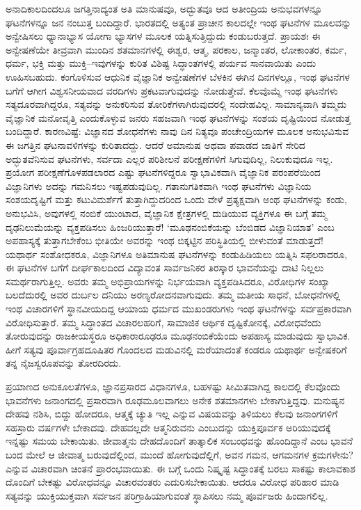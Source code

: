 ಅನಾದಿಕಾಲದಿಂದಲೂ ಜಗತ್ತಿನಾದ್ಯಂತ ಅತಿ ಮಾನುಷವೂ, ಅದ್ಭುತವೂ ಆದ ಅತೀಂದ್ರಿಯ ಅನುಭವಗಳನ್ನೂ ಘಟನೆಗಳನ್ನೂ ಜನ ನಂಬುತ್ತ ಬಂದಿದ್ದಾರೆ. ಭಾರತದಲ್ಲಿ ಅತ್ಯಂತ ಪ್ರಾಚೀನ ಕಾಲದಲ್ಲೇ ಇಂಥ ಘಟನೆಗಳ ಮೂಲವನ್ನು ಅನ್ವೇಷಿಸಲು ಧ್ಯಾನಾಭ್ಯಾಸ ಯೋಗಾ ಭ್ಯಾಸಗಳ ಮೂಲಕ ಯತ್ನಿಸುತ್ತಿದ್ದುದು ಕಂಡುಬರುತ್ತದೆ. ಪ್ರಾಯಶಃ ಈ ಅನ್ವೇಷಣೆಯೇ ತೀವ್ರವಾಗಿ ಮುಂದಿನ ಶತಮಾನಗಳಲ್ಲಿ ಈಶ್ವರ, ಆತ್ಮ, ಪರಕಾಲ, ಜನ್ಮಾಂತರ, ಲೋಕಾಂತರ, ಕರ್ಮ, ಧರ್ಮ, ಭಕ್ತಿ ಮತ್ತು ಮುಕ್ತಿ–ಇವುಗಳನ್ನು ಕುರಿತ ವಿಶಿಷ್ಟ ಸಿದ್ಧಾಂತಗಳಲ್ಲಿ ಪರ್ಯವ ಸಾನವಾಯಿತು ಎಂದು ಊಹಿಸಬಹುದು. ಕಂಗೊಳಿಸುವ ಆಧುನಿಕ ವೈಜ್ಞಾನಿಕ ಅನ್ವೇಷಣೆಗಳ ಬೆಳಕಿನ ಈಗಿನ ದಿನಗಳಲ್ಲೂ, ಇಂಥ ಘಟನೆಗಳ ಬಗೆಗೆ ಆಗೀಗ ವಿಶ್ವಸನೀಯವಾದ ವರದಿಗಳು ಪ್ರಕಟವಾಗುವುದನ್ನು ನೋಡುತ್ತೇವೆ. ಕೆಲವೊಮ್ಮೆ ಇಂಥ ಘಟನೆಗಳು ಸತ್ಯದೂರವಾಗಿದ್ದರೂ, ಸತ್ಯವನ್ನು ಅನುಕರಿಸುವ ತೋರಿಕೆಗಳಾಗಿರುವುದರಲ್ಲಿ ಸಂದೇಹವಿಲ್ಲ. ಸಾಮಾನ್ಯವಾಗಿ ತಮ್ಮದು ವೈಜ್ಞಾನಿಕ ಮನೋವೃತ್ತಿ ಎಂದುಕೊಳ್ಳುವ ಜನರು ಸಹಜವಾಗಿ ಇಂಥ ಘಟನೆಗಳನ್ನು ಸಂಶಯ ದೃಷ್ಟಿಯಿಂದ ನೋಡುತ್ತ ಬಂದಿದ್ದಾರೆ. ಕಾರಣವಿಷ್ಟೆ: ವಿಜ್ಞಾನದ ಶೋಧನೆಗಳು ನಾವು ದಿನ ನಿತ್ಯವೂ ಪಂಚೇಂದ್ರಿಯಗಳ ಮೂಲಕ ಅನುಭವಿಸುವ ಈ ಜಗತ್ತಿನ ಘಟನಾವಳಿಗಳನ್ನು ಕುರಿತಾದದ್ದು. ಆದರೆ ಅಮಾನುಷ ಅಥವಾ ಪವಾಡದ ಜಾತಿಗೆ ಸೇರಿದ ಅದ್ಭುತವೆನಿಸುವ ಘಟನೆಗಳು, ಸರ್ವದಾ ಎಲ್ಲರ ಪರಿಶೀಲನೆ ಪರೀಕ್ಷಣೆಗಳಿಗೆ ಸಿಗುವುದಿಲ್ಲ, ನಿಲುಕುವುದೂ ಇಲ್ಲ. ಪ್ರಯೋಗ ಪರೀಕ್ಷಣೆಗೊಳಪಡಲಾರದ ಎಷ್ಟು ಘಟನೆಗಳಿದ್ದರೂ ಸ್ವಾಭಾವಿಕವಾಗಿ ವೈಜ್ಞಾನಿಕ ಪರಂಪರೆಯಿಂದ ವಿಜ್ಞಾನಿಗಳು ಅದನ್ನು ಗಮನಿಸಲು ಇಷ್ಟಪಡುವುದಿಲ್ಲ. ಗತಾನುಗತಿಕವಾಗಿ ಇಂಥ ಘಟನೆಗಳು ವಿಜ್ಞಾನಿಯ ಸಂಶಯದೃಷ್ಟಿಗೆ ಮತ್ತು ಕಟುವಿಮರ್ಶೆಗೆ ತುತ್ತಾಗಿದ್ದುದರಿಂದ ಒಂದು ವೇಳೆ ಪ್ರತ್ಯಕ್ಷವಾಗಿ ಅಂಥ ಘಟನೆಗಳನ್ನು ಕಂಡು, ಅನುಭವಿಸಿ, ಅವುಗಳಲ್ಲಿ ನಂಬಿಕೆ ಯುಂಟಾದ, ವೈಜ್ಞಾನಿಕ ಕ್ಷೇತ್ರಗಳಲ್ಲಿ ದುಡಿಯುವ ವ್ಯಕ್ತಿಗಳೂ ಈ ಬಗ್ಗೆ ತಮ್ಮ ದೃಢನಿಲುಮೆಯನ್ನು ವ್ಯಕ್ತಪಡಿಸಲು ಹಿಂಜರಿಯುತ್ತಾರೆ! ‘ಮೂಢನಂಬಿಕೆಯನ್ನು ಬೆಂಬಿಡದ ವಿಜ್ಞಾನಿಯಾತ’ ಎಂಬ ಅಪಹಾಸ್ಯಕ್ಕೆ ತುತ್ತಾಗಬೇಕೆಂಬ ಭೀತಿಯೇ ಅವರನ್ನು ಇಂಥ ಬಿಕ್ಕಟ್ಟಿನ ಪರಿಸ್ಥಿತಿಯಲ್ಲಿ ಬೀಳುವಂತೆ ಮಾಡುತ್ತದೆ! ಯಥಾರ್ಥ ಸಂಶೋಧಕರೂ, ವಿಜ್ಞಾನಿಗಳೂ ಅತಿಮಾನುಷ ಘಟನೆಗಳನ್ನು ಕಂಡುಹಿಡಿಯಲು ಯತ್ನಿಸಿ ಸಫಲರಾದರೂ, ಈ ಘಟನೆಗಳ ಬಗೆಗೆ ದೀರ್ಘಕಾಲದಿಂದ ವಿದ್ಯಾವಂತ ಸಾರ್ವಜನಿಕರ ತಿರಸ್ಕಾರ ಭಾವನೆಯನ್ನು ದಾಟಿ ನಿಲ್ಲಲು ಸಮರ್ಥರಾಗುತ್ತಿಲ್ಲ. ಅವರು ತಮ್ಮ ಅಭಿಪ್ರಾಯಗಳನ್ನು ನಿರ್ಭಯವಾಗಿ ವ್ಯಕ್ತಪಡಿಸಿದರೂ, ವಿರೋಧಿಗಳ ಸಂಖ್ಯಾ ಬಲದೆದುರಲ್ಲಿ ಅವರ ದುರ್ಬಲ ದನಿಯು ಅರಣ್ಯರೋದನವಾಗುವುದು. ತಮ್ಮ ಮತೀಯ ಸಾಧನೆ, ಬೋಧನೆಗಳಲ್ಲಿ ಇಂಥ ವಿಚಾರಗಳಿಗೆ ಸ್ಥಾನವೀಯದಿದ್ದ ಆಯಾಯ ಧರ್ಮದ ಮುಖಂಡರುಗಳು ಇಂಥ ಘಟನೆಗಳನ್ನು ಸರ್ವಪ್ರಕಾರವಾಗಿ ವಿರೋಧಿಸುತ್ತಾರೆ. ತಮ್ಮ ಸಿದ್ಧಾಂತದ ವಿಚಾರಲಹರಿಗೆ, ಸಾಮಾಜಿಕ ಆರ್ಥಿಕ ದೃಷ್ಟಿಕೋನಕ್ಕೆ, ವಿರೋಧವೆಂದು ತೋರುವುದನ್ನು ರಾಜಕೀಯಸ್ಥರೂ ಅಧಿಕಾರಾರೂಢರೂ ಮೂಢನಂಬಿಕೆಯೆಂದು ಅಪಹಾಸ್ಯ ಮಾಡುವುದು ಸ್ವಾಭಾವಿಕ. ಹೀಗೆ ಸತ್ಯವು ಪೂರ್ವಾಗ್ರಹದೂಷಿತರ ಗೊಂದಲದ ಮಡುವಿನಲ್ಲಿ ಮರೆಯಾದಂತೆ ಕಂಡರೂ ಯಥಾರ್ಥ ಅನ್ವೇಷಕರಿಗೆ ತನ್ನ ನೈಜಸ್ವರೂಪವನ್ನು ತೋರದಿರದು.

ಪ್ರಯಾಣದ ಅನುಕೂಲತೆಗಳೂ, ಜ್ಞಾನಪ್ರಸಾರದ ವಿಧಾನಗಳೂ, ಬಹಳಷ್ಟು ಸೀಮಿತವಾಗಿದ್ದ ಕಾಲದಲ್ಲಿ ಕೆಲವೊಂದು ಭಾವನೆಗಳು ಜನಾಂಗದಲ್ಲಿ ಪ್ರಸಾರವಾಗಿ ರೂಢಮೂಲವಾಗಲು ಅನೇಕ ಶತಮಾನಗಳು ಬೇಕಾಗುತ್ತಿದ್ದವು. ಮನುಷ್ಯನ ದೇಹವು ನಶಿಸಿ, ಬಿದ್ದು ಹೋದರೂ, ಆತ್ಮಕ್ಕೆ ಚ್ಯುತಿ ಇಲ್ಲ ಎನ್ನುವ ವಿಷಯವನ್ನು ತಿಳಿಯಲು ಕೆಲವು ಜನಾಂಗಗಳಿಗೆ ಸಹಸ್ರಾರು ವರ್ಷಗಳೇ ಬೇಕಾದವು. ದೇಹವಲ್ಲದೇ ಆತ್ಮನಿರುವನು ಎಂಬುದನ್ನು ಯುಕ್ತಿಪೂರ್ವಕ ಅರಿಯುವುದಕ್ಕೆ ಇನ್ನಷ್ಟು ಸಮಯ ಬೇಕಾಯಿತು. ಜೀವಾತ್ಮನು ದೇಹದೊಂದಿಗೆ ತಾತ್ಕಾಲಿಕ ಸಂಬಂಧವನ್ನು ಹೊಂದಿದ್ದಾನೆ ಎಂಬ ಭಾವನೆ ಬಂದ ಮೇಲೆ ಆ ಜೀವಾತ್ಮ ಬರುವುದೆಲ್ಲಿಂದ, ಮುಂದೆ ಹೋಗುವುದೆಲ್ಲಿಗೆ, ಅವನ ಗಮನ, ಆಗಮನಗಳ ಕ್ರಮಗಳೇನು? ಎನ್ನುವ ವಿಚಾರವಾಗಿ ಚಿಂತನೆ ಪ್ರಾರಂಭವಾಯಿತು. ಈ ಬಗ್ಗೆ ಒಂದು ನಿಷ್ಕೃಷ್ಟ ಸಿದ್ಧಾಂತಕ್ಕೆ ಬರಲು ಸಾಕಷ್ಟು ಕಾಲಾವಕಾಶ ದೊಂದಿಗೆ ಬೇಕಷ್ಟು ವಿರೋಧವನ್ನೂ ವಿಚಾರವಂತರು ಎದುರಿಸಬೇಕಾಯಿತು. ಆದರೂ ವಿರೋಧ ಪರಿಹಾರ ಮಾಡಿ ಸತ್ಯವನ್ನು ಯುಕ್ತಿಯುಕ್ತವಾಗಿ ಸರ್ವಜನ ಪರಿಗ್ರಾಹಿಯಾಗುವಂತೆ ಸ್ಥಾಪಿಸಲು ನಮ್ಮ ಪೂರ್ವಜರು ಹಿಂದಾಗಲಿಲ್ಲ.

